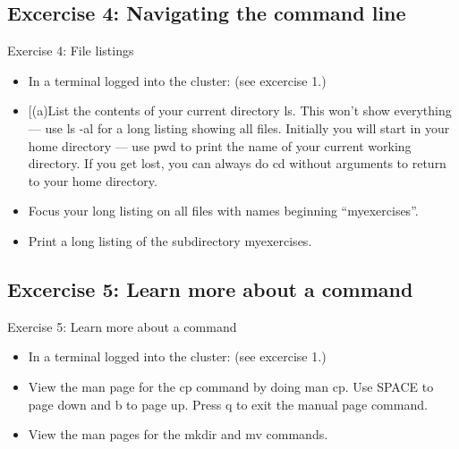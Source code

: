 \subsection{Excercise 4: Navigating the command line}
\begin{frame}{Exercise 4: File listings}
\begin{itemize}
\item{In a terminal logged into the cluster: (see excercise 1.)}
\item{[(a)List the contents of your current directory \alert{ls}. This won't show everything --- use \alert{ls -al} for a long listing showing all files. Initially you will start in your home directory --- use \alert{pwd} to print the name of your current working directory. If you get lost, you can always do \alert{cd} without arguments to return to your home directory.}

\item[(b)]{Focus your long listing on \alert{all files with names beginning ``myexercises''}.}

\item[(c)]{Print a long listing of the subdirectory \alert{myexercises}.}

\end{itemize}
\end{frame}

\subsection{Excercise 5: Learn more about a command}
\begin{frame}{Exercise 5: Learn more about a command}
\begin{itemize}
\item{In a terminal logged into the cluster: (see excercise 1.)}
\item[(a)]{View the man page for the \alert{cp} command by doing \alert{man cp}. 
Use \alert{SPACE} to page down and \alert{b} to page up. Press \alert{q} to exit the manual page command.}
\item[(b)]{View the man pages for the \alert{mkdir} and \alert{mv} commands. }
\end{itemize}
\end{frame}






